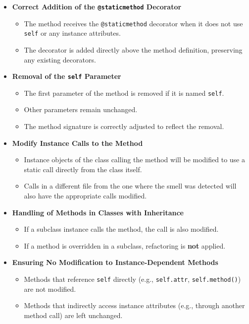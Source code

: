 \documentclass[12pt, titlepage]{article}
\begin{document}
\begin{itemize}
    \item \textbf{Correct Addition of the \texttt{@staticmethod} Decorator}
    \begin{itemize}
        \item The method receives the \texttt{@staticmethod} decorator when it does not use \texttt{self} or any instance attributes.
        \item The decorator is added directly above the method definition, preserving any existing decorators.
    \end{itemize}

    \item \textbf{Removal of the \texttt{self} Parameter}
    \begin{itemize}
        \item The first parameter of the method is removed if it is named \texttt{self}.
        \item Other parameters remain unchanged.
        \item The method signature is correctly adjusted to reflect the removal.
    \end{itemize}

    \item \textbf{Modify Instance Calls to the Method}
    \begin{itemize}
        \item Instance objects of the class calling the method will be modified to use a static call directly from the class itself.
        \item Calls in a different file from the one where the smell was detected will also have the appropriate calls modified.
    \end{itemize}

    \item \textbf{Handling of Methods in Classes with Inheritance}
    \begin{itemize}
        \item If a subclass instance calls the method, the call is also modified.
        \item If a method is overridden in a subclass, refactoring is \textbf{not} applied.
    \end{itemize}

    \item \textbf{Ensuring No Modification to Instance-Dependent Methods}
    \begin{itemize}
        \item Methods that reference \texttt{self} directly (e.g., \texttt{self.attr}, \texttt{self.method()}) are not modified.
        \item Methods that indirectly access instance attributes (e.g., through another method call) are left unchanged.
    \end{itemize}


\end{itemize}
\end{document}
